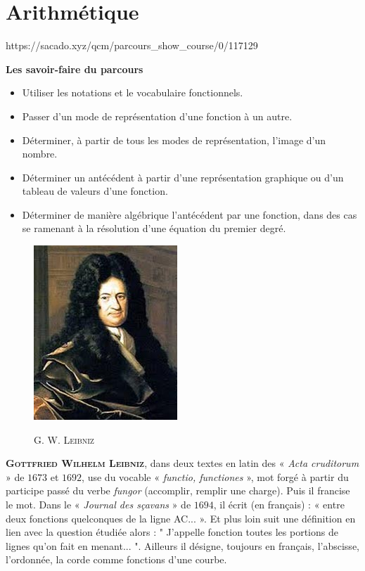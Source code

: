 \chapter{Arithmétique}
{https://sacado.xyz/qcm/parcours_show_course/0/117129}
{
 \begin{CpsCol}
\textbf{Les savoir-faire du parcours}
 \begin{itemize}
 \item Utiliser les notations et le vocabulaire fonctionnels.
 \item Passer d'un mode de représentation d'une fonction à un autre.
 \item Déterminer, à partir de tous les modes de représentation, l'image d'un nombre.
 \item Déterminer un antécédent à partir d'une représentation graphique ou d'un tableau de valeurs d'une fonction.
 \item Déterminer de manière algébrique l'antécédent par une fonction, dans des cas se ramenant à la résolution d'une équation du premier degré.
 \end{itemize}
 
 \end{CpsCol}
 
 \begin{His}
 
\begin{figure}
\vspace{-7mm}
\includegraphics[scale=0.5]{FIG//liebniz.jpg}
\begin{center}
 G. W. \textsc{Leibniz}
 \end{center} 
\end{figure}

\textbf{\textsc{Gottfried Wilhelm Leibniz}},  dans  deux  textes  en  latin  des  « \textit{Acta  cruditorum}  »  de  $1673$  et  $1692$,  use  du vocable  «  \textit{functio, functiones} », mot  forgé  à  partir  du  participe  passé  du  verbe \textit{fungor}   (accomplir,   remplir   une  charge).  Puis  il  francise  le  mot.  Dans  le  « \textit{Journal des sçavans} » de $1694$, il écrit (en   français)   :   «   entre   deux  fonctions   quelconques de la ligne AC... ». Et plus  loin  suit  une  définition  en  lien  avec  la  question    étudiée    alors    :  " J'appelle fonction  toutes  les  portions  de  lignes qu'on  fait  en  menant... ".  Ailleurs  il  désigne,  toujours  en  français,  l'abscisse,  l'ordonnée,  la  corde  comme  fonctions  d'une courbe.


\end{His}}
